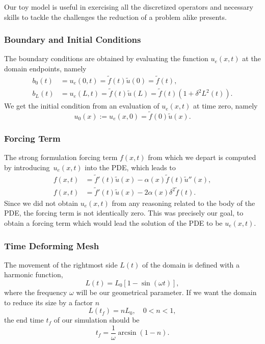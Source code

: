 \documentclass[../main.tex]{subfiles}
\begin{document}
Our toy model is useful in exercising all the discretized operators and necessary skills to tackle the challenges the reduction of a problem alike presents. 

\subsubsection{Boundary and Initial Conditions}
The boundary conditions are obtained by evaluating the function $u_e(x,t)$ at the domain endpoints, namely 
\begin{subequations}
    \label{eq:1d_fom_mfp_boundary_conditions}
    \begin{align}
        b_0(t) &= u_e(0,t) = \tilde{f}(t) \tilde{u}(0) = \tilde{f}(t), \\
        b_L(t) &= u_e(L,t) = \tilde{f}(t) \tilde{u}(L) = \tilde{f}(t)\left(1 + \delta^2L^2(t)\right).
    \end{align}
\end{subequations}
We get the initial condition from an evaluation of $u_e(x,t)$ at time zero, namely
\begin{equation}
    u_0(x) := u_e(x,0) = \tilde{f}(0) \tilde{u}(x).
\end{equation}

\subsubsection{Forcing Term}
The strong formulation forcing term $f(x,t)$ from which we depart is computed by introducing~$u_e(x,t)$ into the PDE, which leads to
\begin{subequations}
    \label{eq:1d_fom_mfp_forcing_term}
    \begin{align}
        f(x,t) &= \tilde{f}'(t) \tilde{u}(x) - \alpha(x) \tilde{f}(t) \tilde{u}''(x), \\
        f(x,t) &= \tilde{f}'(t) \tilde{u}(x) - 2 \alpha(x) \delta^2 \tilde{f}(t).
    \end{align}
\end{subequations}
Since we did not obtain $u_e(x,t)$ from any reasoning related to the body of the PDE, 
the forcing term is not identically zero.
This was precisely our goal, to obtain a forcing term which would lead the solution of the PDE to be $u_e(x,t)$. 

\subsubsection{Time Deforming Mesh}
The movement of the rightmost side $L(t)$ of the domain is defined with a harmonic function, 
\begin{equation}
    L(t) = L_0 \left[1 - \sin\left(\omega t\right)\right],
\end{equation}
where the frequency $\omega$ will be our geometrical parameter.
If we want the domain to reduce its size by a factor $n$
\begin{equation}
    L(t_f) = n L_0, \quad 0 < n < 1,
\end{equation}
the end time $t_f$ of our simulation should be
\begin{equation}
    t_f = \frac{1}{\omega} \arcsin\left(1 - n\right).
\end{equation}
\end{document}
